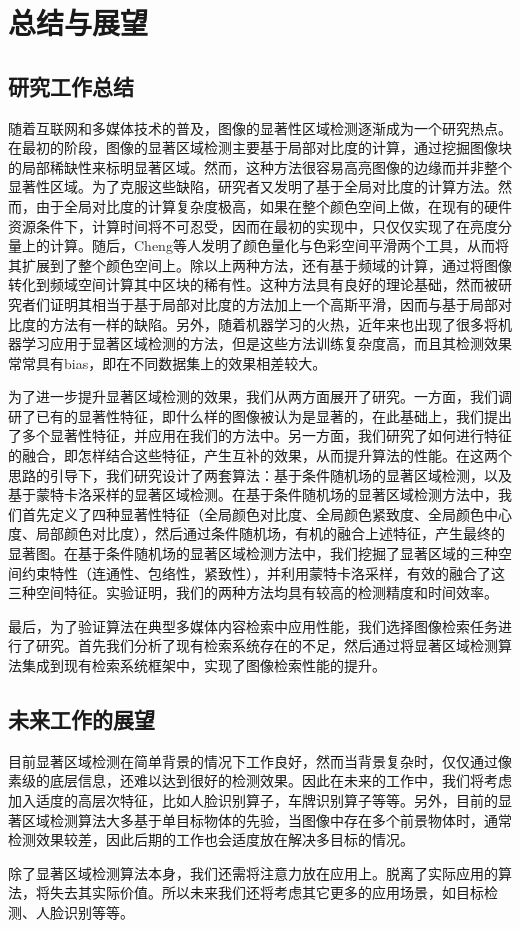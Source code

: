 \chapter{总结与展望}
\section{研究工作总结}
随着互联网和多媒体技术的普及，图像的显著性区域检测逐渐成为一个研究热点。在最初的阶段，图像的显著区域检测主要基于局部对比度的计算，通过挖掘图像块的局部稀缺性来标明显著区域。然而，这种方法很容易高亮图像的边缘而并非整个显著性区域。为了克服这些缺陷，研究者又发明了基于全局对比度的计算方法。然而，由于全局对比度的计算复杂度极高，如果在整个颜色空间上做，在现有的硬件资源条件下，计算时间将不可忍受，因而在最初的实现中，只仅仅实现了在亮度分量上的计算。随后，Cheng等人\cite{cheng2011global}发明了颜色量化与色彩空间平滑两个工具，从而将其扩展到了整个颜色空间上。除以上两种方法，还有基于频域的计算，通过将图像转化到频域空间计算其中区块的稀有性。这种方法具有良好的理论基础，然而被研究者们证明其相当于基于局部对比度的方法加上一个高斯平滑，因而与基于局部对比度的方法有一样的缺陷。另外，随着机器学习的火热，近年来也出现了很多将机器学习应用于显著区域检测的方法，但是这些方法训练复杂度高，而且其检测效果常常具有bias，即在不同数据集上的效果相差较大。

为了进一步提升显著区域检测的效果，我们从两方面展开了研究。一方面，我们调研了已有的显著性特征，即什么样的图像被认为是显著的，在此基础上，我们提出了多个显著性特征，并应用在我们的方法中。另一方面，我们研究了如何进行特征的融合，即怎样结合这些特征，产生互补的效果，从而提升算法的性能。在这两个思路的引导下，我们研究设计了两套算法：基于条件随机场的显著区域检测，以及基于蒙特卡洛采样的显著区域检测。在基于条件随机场的显著区域检测方法中，我们首先定义了四种显著性特征（全局颜色对比度、全局颜色紧致度、全局颜色中心度、局部颜色对比度），然后通过条件随机场，有机的融合上述特征，产生最终的显著图。在基于条件随机场的显著区域检测方法中，我们挖掘了显著区域的三种空间约束特性（连通性、包络性，紧致性），并利用蒙特卡洛采样，有效的融合了这三种空间特征。实验证明，我们的两种方法均具有较高的检测精度和时间效率。

最后，为了验证算法在典型多媒体内容检索中应用性能，我们选择图像检索任务进行了研究。首先我们分析了现有检索系统存在的不足，然后通过将显著区域检测算法集成到现有检索系统框架中，实现了图像检索性能的提升。

\section{未来工作的展望}
目前显著区域检测在简单背景的情况下工作良好，然而当背景复杂时，仅仅通过像素级的底层信息，还难以达到很好的检测效果。因此在未来的工作中，我们将考虑加入适度的高层次特征，比如人脸识别算子，车牌识别算子等等。另外，目前的显著区域检测算法大多基于单目标物体的先验，当图像中存在多个前景物体时，通常检测效果较差，因此后期的工作也会适度放在解决多目标的情况。

除了显著区域检测算法本身，我们还需将注意力放在应用上。脱离了实际应用的算法，将失去其实际价值。所以未来我们还将考虑其它更多的应用场景，如目标检测、人脸识别等等。


